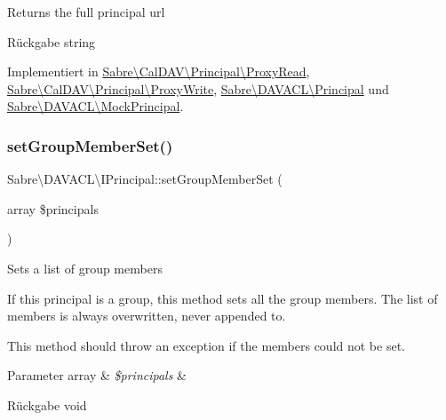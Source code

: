 Returns the full principal url

\begin{DoxyReturn}{Rückgabe}
string 
\end{DoxyReturn}


Implementiert in \mbox{\hyperlink{class_sabre_1_1_cal_d_a_v_1_1_principal_1_1_proxy_read_af1080cef7fe7a5769be9cc82ff959a44}{Sabre\textbackslash{}\+Cal\+D\+A\+V\textbackslash{}\+Principal\textbackslash{}\+Proxy\+Read}}, \mbox{\hyperlink{class_sabre_1_1_cal_d_a_v_1_1_principal_1_1_proxy_write_acc1725448da125be478676c93a0d8cc6}{Sabre\textbackslash{}\+Cal\+D\+A\+V\textbackslash{}\+Principal\textbackslash{}\+Proxy\+Write}}, \mbox{\hyperlink{class_sabre_1_1_d_a_v_a_c_l_1_1_principal_ab423bb78114f5948783b5b1832f163e7}{Sabre\textbackslash{}\+D\+A\+V\+A\+C\+L\textbackslash{}\+Principal}} und \mbox{\hyperlink{class_sabre_1_1_d_a_v_a_c_l_1_1_mock_principal_a41a75dafe4ec09a4570812cf6c8d2c3d}{Sabre\textbackslash{}\+D\+A\+V\+A\+C\+L\textbackslash{}\+Mock\+Principal}}.

\mbox{\label{interface_sabre_1_1_d_a_v_a_c_l_1_1_i_principal_a9dfeb1ed9f70016333ef2b0ec1753677}} 
\subsubsection{\texorpdfstring{set\+Group\+Member\+Set()}{setGroupMemberSet()}}
{\footnotesize\ttfamily Sabre\textbackslash{}\+D\+A\+V\+A\+C\+L\textbackslash{}\+I\+Principal\+::set\+Group\+Member\+Set (\begin{DoxyParamCaption}\item[{array}]{\$principals }\end{DoxyParamCaption})}

Sets a list of group members

If this principal is a group, this method sets all the group members. The list of members is always overwritten, never appended to.

This method should throw an exception if the members could not be set.


\begin{DoxyParams}[1]{Parameter}
array & {\em \$principals} & \\
\hline
\end{DoxyParams}
\begin{DoxyReturn}{Rückgabe}
void 
\end{DoxyReturn}


